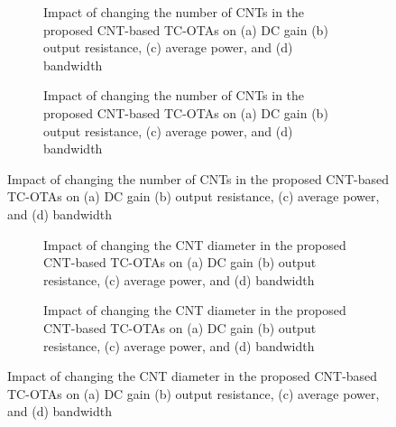 \begin{figure}[htbp]
  \centering
  \begin{subfigure}[b]{0.48\linewidth}
    \centering
    \caption{Impact of changing the number of CNTs in the proposed CNT-based TC-OTAs on (a) DC gain (b) output resistance, (c) average power, and (d) bandwidth}

  \end{subfigure}
  \hfill
  \begin{subfigure}[b]{0.48\linewidth}
    \centering
    \caption{Impact of changing the number of CNTs in the proposed CNT-based TC-OTAs on (a) DC gain (b) output resistance, (c) average power, and (d) bandwidth}

  \end{subfigure}
  \caption{Impact of changing the number of CNTs in the proposed CNT-based TC-OTAs on (a) DC gain (b) output resistance, (c) average power, and (d) bandwidth}

  \label{fig:group_hyrsd}
\end{figure}

\begin{figure}[htbp]
  \centering
  \begin{subfigure}[b]{0.48\linewidth}
    \centering
    \caption{Impact of changing the CNT diameter in the proposed CNT-based TC-OTAs on (a) DC gain (b) output resistance, (c) average power, and (d) bandwidth}

  \end{subfigure}
  \hfill
  \begin{subfigure}[b]{0.48\linewidth}
    \centering
    \caption{Impact of changing the CNT diameter in the proposed CNT-based TC-OTAs on (a) DC gain (b) output resistance, (c) average power, and (d) bandwidth}

  \end{subfigure}
  \caption{Impact of changing the CNT diameter in the proposed CNT-based TC-OTAs on (a) DC gain (b) output resistance, (c) average power, and (d) bandwidth}

  \label{fig:group_wxw2q}
\end{figure}

